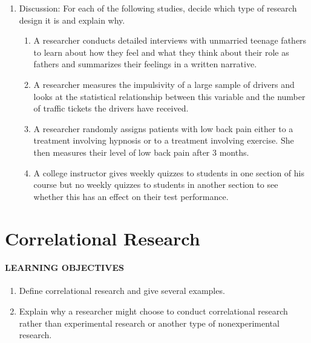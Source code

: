 \documentclass[
]{krantz}
\providecommand{\tightlist}{%
  \setlength{\itemsep}{0pt}\setlength{\parskip}{0pt}}
\begin{document}
\begin{enumerate}
\def\labelenumi{\arabic{enumi}.}
\tightlist
\item
  Discussion: For each of the following studies, decide which type of research design it is and explain why.

  \begin{enumerate}
  \def\labelenumii{\alph{enumii}.}
  \tightlist
  \item
    A researcher conducts detailed interviews with unmarried teenage fathers to learn about how they feel and what they think about their role as fathers and summarizes their feelings in a written narrative.
  \item
    A researcher measures the impulsivity of a large sample of drivers and looks at the statistical relationship between this variable and the number of traffic tickets the drivers have received.
  \item
    A researcher randomly assigns patients with low back pain either to a treatment involving hypnosis or to a treatment involving exercise. She then measures their level of low back pain after 3 months.
  \item
    A college instructor gives weekly quizzes to students in one section of his course but no weekly quizzes to students in another section to see whether this has an effect on their test performance.
  \end{enumerate}
\end{enumerate}

\hypertarget{correlational-research}{%
\section{Correlational Research}\label{correlational-research}}

\hypertarget{learning-objectives-24}{%
\paragraph*{LEARNING OBJECTIVES}\label{learning-objectives-24}}

\begin{enumerate}
\def\labelenumi{\arabic{enumi}.}
\tightlist
\item
  Define correlational research and give several examples.
\item
  Explain why a researcher might choose to conduct correlational research rather than experimental research or another type of nonexperimental research.
\end{enumerate}
\end{document}
